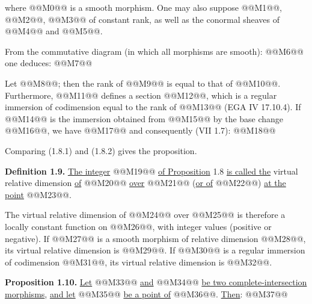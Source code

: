 where @@M0@@ is a
smooth morphism. One may also suppose @@M1@@, @@M2@@, @@M3@@ of constant rank, as well as the conormal sheaves of @@M4@@ and @@M5@@.

From the commutative diagram (in which all morphisms are smooth):
@@M6@@
one deduces:
@@M7@@

Let @@M8@@; then the rank of @@M9@@ is equal to that of @@M10@@. Furthermore, @@M11@@ defines a section @@M12@@, which is a regular immersion of codimension equal to the rank of @@M13@@ (EGA IV 17.10.4). If @@M14@@ is the immersion obtained from @@M15@@ by the base change @@M16@@, we have @@M17@@ and consequently (VII 1.7):
@@M18@@

Comparing (1.8.1) and (1.8.2) gives the proposition.

\textbf{Definition 1.9.} \uline{The integer} @@M19@@ \uline{of Proposition} 1.8 \uline{is called the} virtual relative dimension \uline{of} @@M20@@ \uline{over} @@M21@@ (\uline{or of} @@M22@@) \uline{at the point} @@M23@@.

The virtual relative dimension of @@M24@@ over @@M25@@ is therefore a locally constant function on @@M26@@, with integer values (positive or negative). If @@M27@@ is a smooth morphism of relative dimension @@M28@@, its virtual relative dimension is @@M29@@. If @@M30@@ is a regular immersion of codimension @@M31@@, its virtual relative dimension is @@M32@@.

\textbf{Proposition 1.10.} \uline{Let} @@M33@@ \uline{and} @@M34@@ \uline{be two complete-intersection morphisms}, \uline{and let} @@M35@@ \uline{be a point of} @@M36@@. \uline{Then}:
@@M37@@
